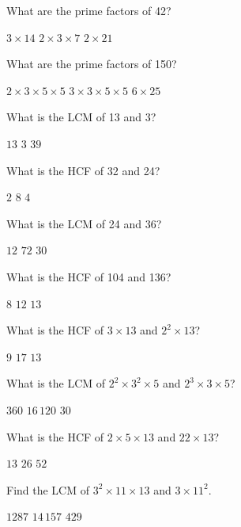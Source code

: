 \documentclass{article}
\begin{document}
\begin{questions}

\question
What are the prime factors of 42?
\begin{choices}
\choice $3\times 14$
\correctchoice $2\times 3\times 7$
\choice $2\times 21$
\end{choices}

\question
What are the prime factors of 150?
\begin{choices}
\correctchoice $2\times 3\times 5\times 5$
\choice $3\times 3\times 5\times 5$
\choice $6\times 25$
\end{choices}

\question
What is the LCM of 13 and 3?
\begin{choices}
\choice $13$
\choice $3$
\correctchoice $39$
\end{choices}

\question
What is the HCF of 32 and 24?
\begin{choices}
\choice $2$
\correctchoice $8$
\choice $4$
\end{choices}

\question
What is the LCM of 24 and 36?
\begin{choices}
\choice $12$
\correctchoice $72$
\choice $30$
\end{choices}

\question
What is the HCF of 104 and 136?
\begin{choices}
\correctchoice $8$
\choice $12$
\choice $13$
\end{choices}

\question
What is the HCF of $3\times 13$ and $2^2\times 13$?
\begin{choices}
\choice $9$
\choice $17$
\correctchoice $13$
\end{choices}

\newpage %
\question
What is the LCM of $2^2\times 3^2\times 5$ and $2^3\times 3\times 5$?
\begin{choices}
\correctchoice $360$
\choice $16\,120$
\choice $30$
\end{choices}

\question
What is the HCF of $2\times 5\times 13$ and $22\times 13$?
\begin{choices}
\choice $13$
\correctchoice $26$
\choice $52$
\end{choices}

\question
Find the LCM of $3^2\times 11\times 13$ and $3\times 11^2$.
\begin{choices}
\choice $1287$
\correctchoice $14\,157$
\choice $429$
\end{choices}

\end{questions}


\end{document}
